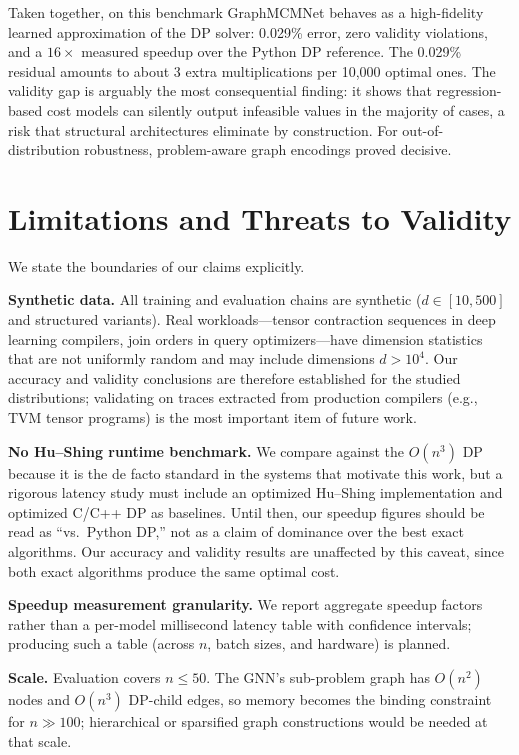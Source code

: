 \documentclass[conference]{IEEEtran}
\begin{document}
Taken together, on this benchmark GraphMCMNet behaves as a high-fidelity
learned approximation of the DP solver: 0.029\% error, zero validity
violations, and a $16\times$ measured speedup over the Python DP reference.
The 0.029\% residual amounts to about 3 extra multiplications per 10{,}000
optimal ones. The validity gap is arguably the most consequential finding: it
shows that regression-based cost models \cite{neo2019,balsa2022} can silently
output infeasible values in the majority of cases, a risk that structural
architectures eliminate by construction. For out-of-distribution robustness,
problem-aware graph encodings \cite{bengio2021} proved decisive.

\section{Limitations and Threats to Validity}
\label{sec:limitations}

We state the boundaries of our claims explicitly.

\textbf{Synthetic data.} All training and evaluation chains are synthetic
($d \in [10, 500]$ and structured variants). Real workloads---tensor
contraction sequences in deep learning compilers, join orders in query
optimizers---have dimension statistics that are not uniformly random and may
include dimensions $d > 10^4$. Our accuracy and validity conclusions are
therefore established for the studied distributions; validating on traces
extracted from production compilers (e.g., TVM tensor programs) is the most
important item of future work.

\textbf{No Hu--Shing runtime benchmark.} We compare against the $O(n^3)$ DP
because it is the de facto standard in the systems that motivate this work,
but a rigorous latency study must include an optimized Hu--Shing
implementation and optimized C/C++ DP as baselines. Until then, our speedup
figures should be read as ``vs.\ Python DP,'' not as a claim of dominance over
the best exact algorithms. Our accuracy and validity results are unaffected by
this caveat, since both exact algorithms produce the same optimal cost.

\textbf{Speedup measurement granularity.} We report aggregate speedup factors
rather than a per-model millisecond latency table with confidence intervals;
producing such a table (across $n$, batch sizes, and hardware) is planned.

\textbf{Scale.} Evaluation covers $n \le 50$. The GNN's sub-problem graph has
$O(n^2)$ nodes and $O(n^3)$ DP-child edges, so memory becomes the binding
constraint for $n \gg 100$; hierarchical or sparsified graph constructions
would be needed at that scale.
\end{document}
